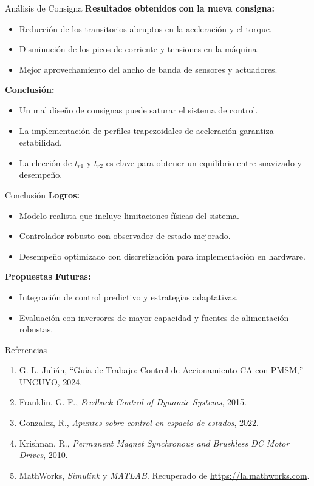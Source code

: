 \documentclass[12pt]{beamer}
\begin{document}
\begin{frame}{Análisis de Consigna}
    \textbf{Resultados obtenidos con la nueva consigna:}
    \begin{itemize}
        \item Reducción de los transitorios abruptos en la aceleración y el torque.
        \item Disminución de los picos de corriente y tensiones en la máquina.
        \item Mejor aprovechamiento del ancho de banda de sensores y actuadores.
    \end{itemize}

    \textbf{Conclusión:}  
    \begin{itemize}
        \item Un mal diseño de consignas puede saturar el sistema de control.
        \item La implementación de perfiles trapezoidales de aceleración garantiza estabilidad.
        \item La elección de \( t_{r1} \) y \( t_{r2} \) es clave para obtener un equilibrio entre suavizado y desempeño.
    \end{itemize}
\end{frame}


\begin{frame}{Conclusión}
\textbf{Logros:}
\begin{itemize}
    \item Modelo realista que incluye limitaciones físicas del sistema.
    \item Controlador robusto con observador de estado mejorado.
    \item Desempeño optimizado con discretización para implementación en hardware.
\end{itemize}

\textbf{Propuestas Futuras:}
\begin{itemize}
    \item Integración de control predictivo y estrategias adaptativas.
    \item Evaluación con inversores de mayor capacidad y fuentes de alimentación robustas.
\end{itemize}
\end{frame}

\begin{frame}{Referencias}
\begin{enumerate}
    \item G. L. Julián, “Guía de Trabajo: Control de Accionamiento CA con PMSM,” UNCUYO, 2024.
    \item Franklin, G. F., \textit{Feedback Control of Dynamic Systems}, 2015.
    \item Gonzalez, R., \textit{Apuntes sobre control en espacio de estados}, 2022.
    \item Krishnan, R., \textit{Permanent Magnet Synchronous and Brushless DC Motor Drives}, 2010.
    \item MathWorks, \textit{Simulink} y \textit{MATLAB}. Recuperado de \url{https://la.mathworks.com}.
\end{enumerate}
\end{frame}
\end{document}
